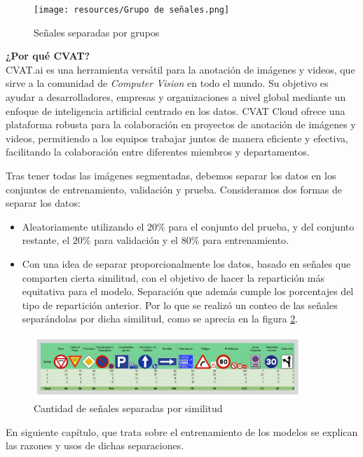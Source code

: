 \documentclass{article}
\begin{document}
\begin{figure}[h]
\centering
\texttt{[image: resources/Grupo de señales.png]}
\caption{Señales separadas por grupos}
\label{fig:Grupos}
\end{figure}

\begin{tcolorbox}
\textbf{¿Por qué CVAT?}\\
CVAT.ai es una herramienta versátil para la anotación de imágenes y videos, que sirve a la comunidad de \textit{Computer Vision} en todo el mundo. Su objetivo es ayudar a desarrolladores, empresas y organizaciones a nivel global mediante un enfoque de inteligencia artificial centrado en los datos. CVAT Cloud ofrece una plataforma robusta para la colaboración en proyectos de anotación de imágenes y videos, permitiendo a los equipos trabajar juntos de manera eficiente y efectiva, facilitando la colaboración entre diferentes miembros y departamentos.
\end{tcolorbox}

Tras tener todas las imágenes segmentadas, debemos separar los datos en los conjuntos de entrenamiento, validación y prueba. Consideramos dos formas de separar los datos:

\begin{itemize}
\item{Aleatoriamente utilizando el $20\%$ para el conjunto del prueba, y del conjunto restante, el $20\%$ para validación y el $80\%$ para entrenamiento.}
\item{Con una idea de separar proporcionalmente los datos, basado en señales que comparten cierta similitud, con el objetivo de hacer la repartición más equitativa para el modelo. Separación que además cumple los porcentajes del tipo de repartición anterior. Por lo que se realizó un conteo de las señales separándolas por dicha similitud, como se aprecia en la figura \ref{fig:sign count}}.
\end{itemize}
\begin{figure}[h]
\centering
\includegraphics[width=0.9\textwidth]{resources/sign count.png}
\caption{Cantidad de señales separadas por similitud}
\label{fig:sign count}
\end{figure}
En siguiente capítulo, que trata sobre el entrenamiento de los modelos se explican las razones y usos de dichas separaciones.
\end{document}
